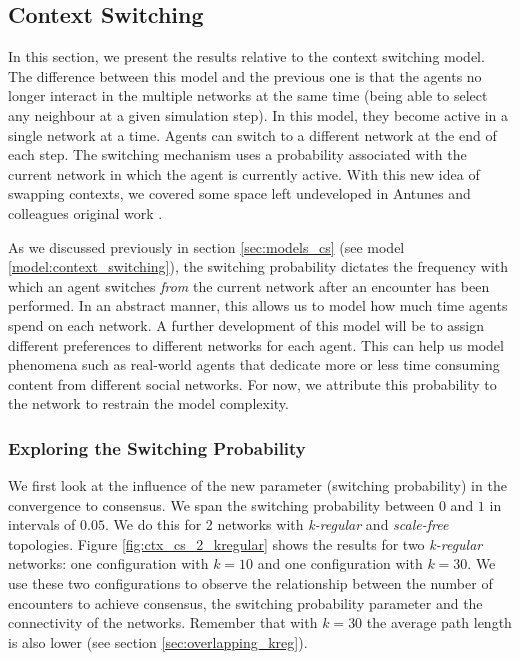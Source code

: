 \documentclass[preprint,number]{elsarticle}
\begin{document}
\subsection{Context Switching}
In this section, we present the results relative to the context switching model. The difference between this model and the previous one is that the agents no longer interact in the multiple networks at the same time (being able to select any neighbour at a given simulation step). In this model, they become active in a single network at a time. Agents can switch to a different network at the end of each step. The switching mechanism uses a probability associated with the current network in which the agent is currently active. With this new idea of swapping contexts, we covered some space left undeveloped in Antunes and colleagues original work \cite{Antunes2007,Antunes2010}. 

As we discussed previously in section \ref{sec:models_cs} (see model \ref{model:context_switching}), the switching probability dictates the frequency with which an agent switches \textit{from} the current network after an encounter has been performed. In an abstract manner, this allows us to model how much time agents spend on each network. A further development of this model will be to assign different preferences to different networks for each agent. This can help us model phenomena such as real-world agents that dedicate more or less time consuming content from different social networks. For now, we attribute this probability to the network to restrain the model complexity.


\subsubsection{Exploring the Switching Probability}
We first look at the influence of the new parameter (switching probability) in the convergence to consensus. We span the switching probability between $0$ and $1$ in intervals of $0.05$. We do this for 2 networks with \textit{k-regular} and \textit{scale-free} topologies. Figure \ref{fig:ctx_cs_2_kregular} shows the results for two \textit{k-regular} networks: one configuration with $k = 10$ and one configuration with $k = 30$. We use these two configurations to observe the relationship between the number of encounters to achieve consensus, the switching probability parameter and the connectivity of the networks. Remember that with $k=30$ the average path length is also lower (see section \ref{sec:overlapping_kreg}). 
\end{document}
